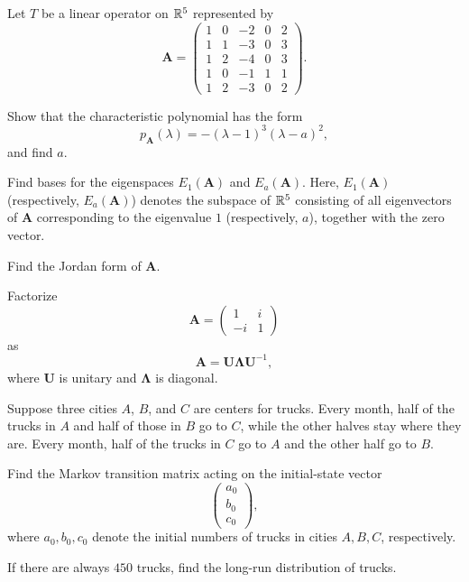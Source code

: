 \begin{problem}
Let $T$ be a linear operator on $\mathbb{R}^5$ represented by
\[
\mathbf A=
\begin{pmatrix}
1&0&-2&0&2\\
1&1&-3&0&3\\
1&2&-4&0&3\\
1&0&-1&1&1\\
1&2&-3&0&2
\end{pmatrix}.
\]
\begin{problemsubparts}
\item Show that the characteristic polynomial has the form
\[
p_{\mathbf A}(\lambda)=-(\lambda-1)^3(\lambda-a)^2,
\]
and find $a$.
\item Find bases for the eigenspaces $E_1(\mathbf A)$ and $E_a(\mathbf A)$. Here, $E_1(\mathbf A)$ (respectively, $E_a(\mathbf A)$) denotes the subspace of $\mathbb{R}^5$ consisting of all eigenvectors of $\mathbf A$ corresponding to the eigenvalue $1$ (respectively, $a$), together with the zero vector.
\item Find the Jordan form of $\mathbf A$.
\end{problemsubparts}
\end{problem}

\begin{problem}
Factorize
\[
\mathbf A=
\begin{pmatrix}
1&i\\
-i&1
\end{pmatrix}
\]
as
\[
\mathbf A=\mathbf U\boldsymbol\Lambda\mathbf U^{-1},
\]
where $\mathbf U$ is unitary and $\boldsymbol\Lambda$ is diagonal.
\end{problem}

\begin{problem}
Suppose three cities $A$, $B$, and $C$ are centers for trucks. Every month, half of the trucks in $A$ and half of those in $B$ go to $C$, while the other halves stay where they are. Every month, half of the trucks in $C$ go to $A$ and the other half go to $B$.
\begin{problemsubparts}
\item Find the Markov transition matrix acting on the initial-state vector
\[
\begin{pmatrix}
a_0\\b_0\\c_0
\end{pmatrix},
\]
where $a_0,b_0,c_0$ denote the initial numbers of trucks in cities $A,B,C$, respectively.
\item If there are always $450$ trucks, find the long-run distribution of trucks.
\end{problemsubparts}
\end{problem}

